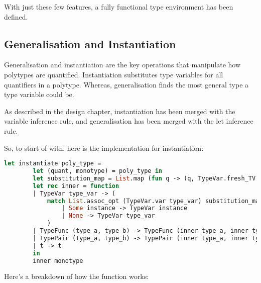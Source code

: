 \documentclass{l4proj}
\begin{document}
With just these few features, a fully functional type environment has been defined.

\subsection{Generalisation and Instantiation}

Generalisation and instantiation are the key operations that manipulate how polytypes are quantified.
Instantiation substitutes type variables for all quantifiers in a polytype.
Whereas, generalisation finds the most general type a type variable could be.

As described in the design chapter, instantiation has been merged with the variable inference rule, and generalisation has been merged with the let inference rule.

So, to start of with, here is the implementation for instantiation:
\begin{lstlisting}[language=Caml, caption=PyFunc's instantiation function.]
    let instantiate poly_type =
        let (quant, monotype) = poly_type in 
        let substitution_map = List.map (fun q -> (q, TypeVar.fresh_TV ())) quant in
        let rec inner = function
        | TypeVar type_var -> (
            match List.assoc_opt (TypeVar.var type_var) substitution_map with
                | Some instance -> TypeVar instance
                | None -> TypeVar type_var
            )
        | TypeFunc (type_a, type_b) -> TypeFunc (inner type_a, inner type_b)
        | TypePair (type_a, type_b) -> TypePair (inner type_a, inner type_b)
        | t -> t
        in
        inner monotype
\end{lstlisting}

Here's a breakdown of how the function works:
\end{document}
